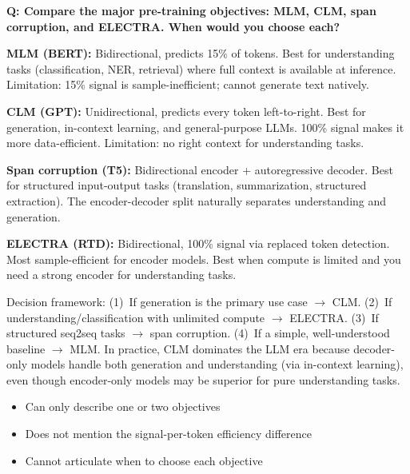 \begin{interviewq}
\end{interviewq}

\bigskip

\begin{interviewq}
\textbf{Q: Compare the major pre-training objectives: MLM, CLM, span corruption,
and ELECTRA. When would you choose each?}

 \quad {} \quad \badgefreq{\freqmed}

\stronganswer
\textbf{MLM (BERT):} Bidirectional, predicts 15\% of tokens.  Best for
understanding tasks (classification, NER, retrieval) where full context is
available at inference.  Limitation: 15\% signal is sample-inefficient; cannot
generate text natively.

\textbf{CLM (GPT):} Unidirectional, predicts every token left-to-right.  Best for
generation, in-context learning, and general-purpose LLMs.  100\% signal makes it
more data-efficient.  Limitation: no right context for understanding tasks.

\textbf{Span corruption (T5):} Bidirectional encoder + autoregressive decoder.  Best
for structured input-output tasks (translation, summarization, structured extraction).
The encoder-decoder split naturally separates understanding and generation.

\textbf{ELECTRA (RTD):} Bidirectional, 100\% signal via replaced token detection.
Most sample-efficient for encoder models.  Best when compute is limited and you
need a strong encoder for understanding tasks.

Decision framework: (1)~If generation is the primary use case $\rightarrow$ CLM.
(2)~If understanding/classification with unlimited compute $\rightarrow$ ELECTRA.
(3)~If structured seq2seq tasks $\rightarrow$ span corruption. (4)~If a simple,
well-understood baseline $\rightarrow$ MLM.  In practice, CLM dominates the LLM
era because decoder-only models handle both generation and understanding (via
in-context learning), even though encoder-only models may be superior for
pure understanding tasks.

\redflags
\begin{itemize}
    \item Can only describe one or two objectives
    \item Does not mention the signal-per-token efficiency difference
    \item Cannot articulate when to choose each objective
\end{itemize}


\end{interviewq}
